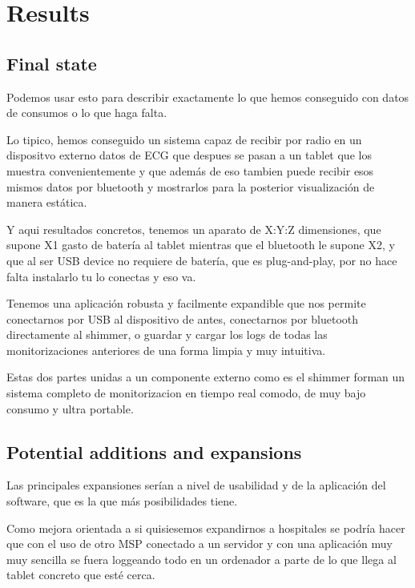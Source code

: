 \chapter{Results}
\label{cha:results}

	\section{Final state}
	
		Podemos usar esto para describir exactamente lo que hemos conseguido con datos de consumos o lo que haga 				falta.

		Lo tipico, hemos conseguido un sistema capaz de recibir por radio en un dispositvo externo datos de ECG que despues se pasan a un tablet que los muestra convenientemente y que además de eso tambien puede recibir esos mismos datos por bluetooth y mostrarlos para la posterior visualización de manera estática.

		Y aqui resultados concretos, tenemos un aparato de X:Y:Z dimensiones, que supone X1 gasto de batería al tablet mientras que el bluetooth le supone X2, y que al ser USB device no requiere de batería, que es plug-and-play, por no hace falta instalarlo tu lo conectas y eso va.

		Tenemos una aplicación robusta y facilmente expandible que nos permite conectarnos por USB al dispositivo de antes, conectarnos por bluetooth directamente al shimmer, o guardar y cargar los logs de todas las monitorizaciones anteriores de una forma limpia y muy intuitiva.

		Estas dos partes unidas a un componente externo como es el shimmer forman un sistema completo de monitorizacion en tiempo real comodo,  de muy bajo consumo y ultra portable.
	
	\section{Potential additions and expansions}

		Las principales expansiones serían a nivel de usabilidad y de la aplicación del software, que es la que más 					posibilidades tiene.

		Como mejora orientada a si quisiesemos expandirnos a hospitales se podría hacer que con el uso de otro MSP conectado a un servidor y con una aplicación muy muy sencilla se fuera loggeando todo en un ordenador a parte de lo que llega al tablet concreto que esté cerca. 

